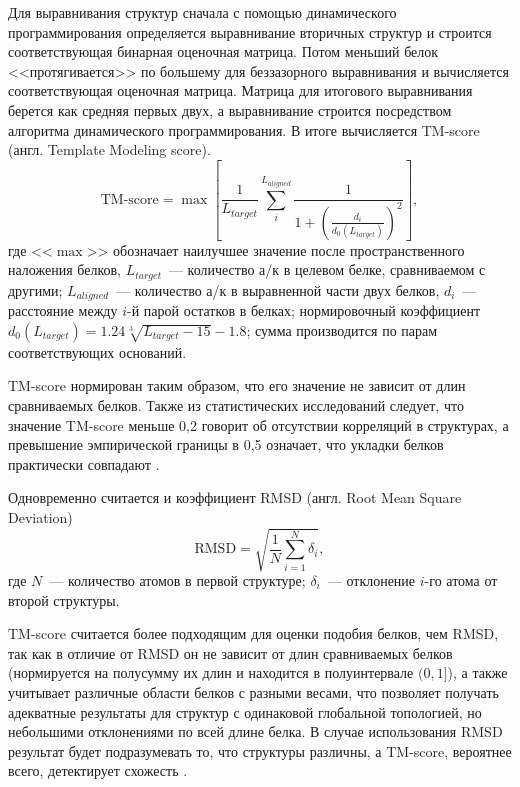 \documentclass[a4paper,14pt]{article}         %
\begin{document}
Для выравнивания структур сначала с помощью динамического программирования определяется выравнивание вторичных структур и строится соответствующая бинарная оценочная матрица. Потом меньший белок <<протягивается>> по большему для беззазорного выравнивания и вычисляется соответствующая оценочная матрица. Матрица для итогового выравнивания берется как средняя первых двух, а выравнивание строится посредством алгоритма динамического программирования. В итоге вычисляется TM-score (англ. Template Modeling score)\cite{Zhang2004, Levitt1998}. 
\begin{equation}
\label{tm-score}
\text{TM-score} = \max\left[\frac{1}{L_{target}}\sum_i^{L_{aligned}}\frac{1}{1+\left(\frac{d_i}{d_0(L_{target})}\right)^2}\right],
\end{equation}
где <<$\max$>> обозначает наилучшее значение после пространственного наложения белков, $L_{target}$~--- количество а/к в целевом белке, сравниваемом с другими; $L_{aligned}$~--- количество а/к в выравненной части двух белков, $d_i$~--- расстояние между $i$-й парой остатков в белках; нормировочный коэффициент $d_0(L_{target}) = 1.24\sqrt[3]{L_{target}-15}-1.8$; сумма производится по парам соответствующих оснований. 

TM-score нормирован таким образом, что его значение не зависит от длин сравниваемых белков. Также из статистических исследований следует, что значение TM-score меньше 0,2 говорит об отсутствии корреляций в структурах, а превышение эмпирической границы в 0,5 означает, что укладки белков практически совпадают \cite{TMalign, Xu2010}. 

Одновременно считается и коэффициент RMSD (англ. Root Mean Square Deviation) %
\begin{equation}
\label{rmsd}
\text{RMSD} = \sqrt{\frac{1}{N}\sum_{i=1}^N \delta_i},
\end{equation}
где $N$~--- количество атомов в первой структуре; $\delta_i$~--- отклонение $i$-го атома от второй структуры.

TM-score считается более подходящим для оценки подобия белков, чем RMSD, так как в отличие от RMSD он не зависит от длин сравниваемых белков (нормируется на полусумму их длин и находится в полуинтервале $(0, 1]$), а также учитывает различные области белков с разными весами, что позволяет получать адекватные результаты для структур с одинаковой глобальной топологией, но небольшими отклонениями по всей длине белка. В случае использования RMSD результат будет подразумевать то, что структуры различны, а TM-score, вероятнее всего, детектирует схожесть \cite{TMalign}.
\end{document}
